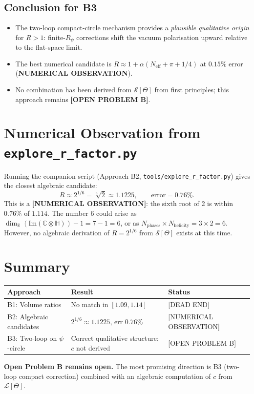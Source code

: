 \documentclass[11pt,a4paper]{article}
\theoremstyle{remark}
\begin{document}
\subsection{Conclusion for B3}

\begin{itemize}
  \item The two-loop compact-circle mechanism provides a \emph{plausible
    qualitative origin} for $R > 1$: finite-$R_\psi$ corrections shift
    the vacuum polarisation upward relative to the flat-space limit.
  \item The best numerical candidate is $R \approx 1 + \alpha(N_{\mathrm{eff}} + \pi + 1/4)$
    at $0.15\%$ error (\textbf{NUMERICAL OBSERVATION}).
  \item No combination has been derived from $\mathcal{S}[\Theta]$ from
    first principles; this approach remains \textbf{[OPEN PROBLEM B]}.
\end{itemize}

\section{Numerical Observation from \texttt{explore\_r\_factor.py}}
\label{sec:r_numerical}

Running the companion script (Approach B2, \texttt{tools/explore\_r\_factor.py})
gives the closest algebraic candidate:
\begin{equation}
  R \approx 2^{1/6} = \sqrt[6]{2} \approx 1.1225, \qquad \text{error} = 0.76\%.
  \label{eq:R_2_sixth}
\end{equation}
This is a \textbf{[NUMERICAL OBSERVATION]}: the sixth root of 2 is within
$0.76\%$ of $1.114$.  The number 6 could arise as
$\dim_\mathbb{R}(\mathrm{Im}(\mathbb{C}\otimes\mathbb{H})) - 1 = 7 - 1 = 6$,
or as $N_{\mathrm{phases}} \times N_{\mathrm{helicity}} = 3 \times 2 = 6$.
However, no algebraic derivation of $R = 2^{1/6}$ from
$\mathcal{S}[\Theta]$ exists at this time.

\section{Summary}
\label{sec:r_summary}

\begin{center}
\begin{tabular}{lll}
  \toprule
  Approach & Result & Status \\
  \midrule
  B1: Volume ratios               & No match in $[1.09, 1.14]$  & [DEAD END] \\
  B2: Algebraic candidates        & $2^{1/6} \approx 1.1225$, err $0.76\%$ & [NUMERICAL OBSERVATION] \\
  B3: Two-loop on $\psi$-circle   & Correct qualitative structure; $c$ not derived & [OPEN PROBLEM B] \\
  \bottomrule
\end{tabular}
\end{center}

\textbf{Open Problem B remains open.}  The most promising direction is B3
(two-loop compact correction) combined with an algebraic computation of
$c$ from $\mathcal{L}[\Theta]$.

\ifdefined\INCLUDEMODE\else
\end{document}
